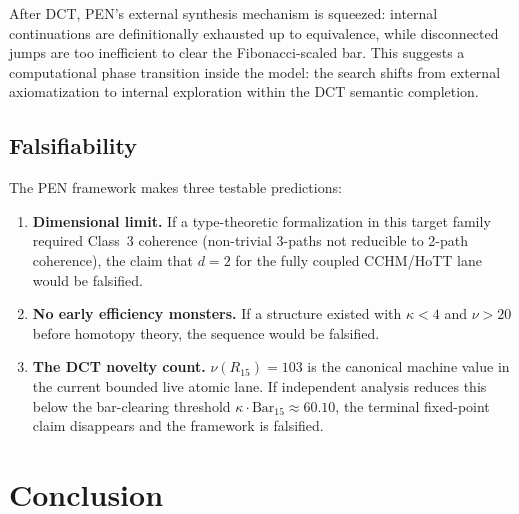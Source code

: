\documentclass[11pt,a4paper]{article}
\theoremstyle{plain}
\theoremstyle{definition}
\theoremstyle{remark}
\begin{document}
After DCT, PEN's external synthesis mechanism is squeezed: internal continuations are definitionally exhausted up to equivalence, while disconnected jumps are too inefficient to clear the Fibonacci-scaled bar.
This suggests a computational phase transition inside the model: the search shifts from external axiomatization to internal exploration within the DCT semantic completion.

\subsection{Falsifiability}

The PEN framework makes three testable predictions:

\begin{enumerate}[nosep]
    \item \textbf{Dimensional limit.}
    If a type-theoretic formalization in this target family required Class~3 coherence (non-trivial 3-paths not reducible to 2-path coherence), the claim that $d = 2$ for the fully coupled CCHM/HoTT lane would be falsified.
    \item \textbf{No early efficiency monsters.}
    If a structure existed with $\kappa < 4$ and $\nu > 20$ before homotopy theory, the sequence would be falsified.
    \item \textbf{The DCT novelty count.}
    $\nu(R_{15}) = 103$ is the canonical machine value in the current bounded live atomic lane.
    If independent analysis reduces this below the bar-clearing threshold $\kappa \cdot \mathrm{Bar}_{15} \approx 60.10$, the terminal fixed-point claim disappears and the framework is falsified.
\end{enumerate}

\section{Conclusion}
\label{sec:conclusion}
\end{document}
